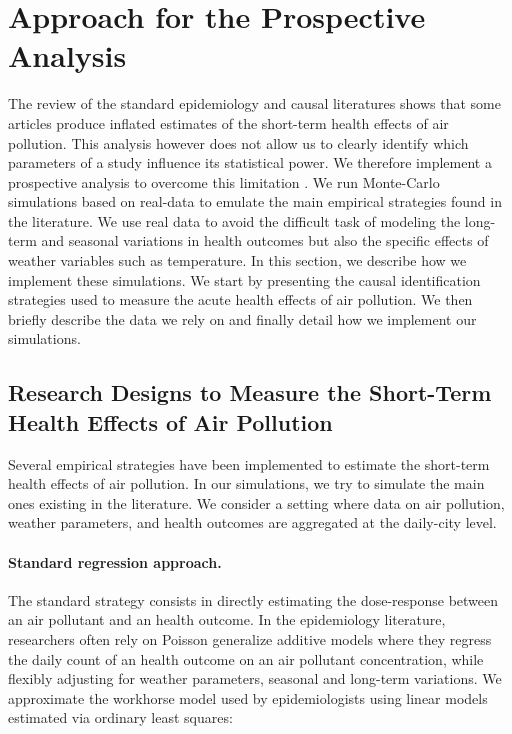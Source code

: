 \documentclass[12pt]{article}
\begin{document}



\section{Approach for the Prospective Analysis}

        The review of the standard epidemiology and causal literatures shows that some articles produce inflated estimates of the short-term health effects of air pollution. This analysis however does not allow us to clearly identify which parameters of a study influence its statistical power. We therefore implement a prospective analysis to overcome this limitation \citep{gelman_beyond_2014, altoe_enhancing_2020, black_simulated_2022}. We run Monte-Carlo simulations based on real-data to emulate the main empirical strategies found in the literature. We use real data to avoid the difficult task of modeling the long-term and seasonal variations in health outcomes but also the specific effects of weather variables such as temperature. In this section, we describe how we implement these simulations. We start by presenting the causal identification strategies used to measure the acute health effects of air pollution. We then briefly describe the data we rely on and finally detail how we implement our simulations.
        
    \subsection{Research Designs to Measure the Short-Term Health Effects of Air Pollution}
        
        Several empirical strategies have been implemented to estimate the short-term health effects of air pollution. In our simulations, we try to simulate the main ones existing in the literature. We consider a setting where data on air pollution, weather parameters, and health outcomes are aggregated at the daily-city level.
        
        \paragraph{Standard regression approach.} The standard strategy consists in directly estimating the dose-response between an air pollutant and an health outcome. In the epidemiology literature, researchers often rely on Poisson generalize additive models where they regress the daily count of an health outcome on an air pollutant concentration, while flexibly adjusting for weather parameters, seasonal and long-term variations. We approximate the workhorse model used by epidemiologists using linear models estimated via ordinary least squares:
        
\end{document}
